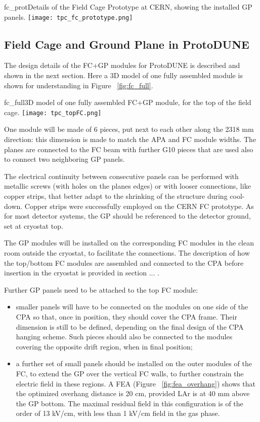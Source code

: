 \begin{cdrfigure}{fc_prot}{Details of the Field Cage Prototype at CERN, showing the installed GP panels.}
\texttt{[image: tpc\_fc\_prototype.png]}
\end{cdrfigure}

\subsection{Field Cage and Ground Plane in ProtoDUNE}

The design details of the FC+GP modules for ProtoDUNE is described and shown in the next section. Here a 3D model of one fully assembled module is shown for understanding in Figure ~\ref{fig:fc_full}.

\begin{cdrfigure}{fc_full}{3D model of one fully assembled FC+GP module, for the top of the field cage. }
\texttt{[image: tpc\_topFC.png]}
\end{cdrfigure}

One module will be made of 6 pieces, put next to each other along the 2318 mm direction: this dimension is made to match the APA and FC module widths. The planes are connected to the FC beam with further G10 pieces that are used also to connect two neighboring GP panels.

The electrical continuity between consecutive panels can be performed with metallic screws (with holes on the planes edges) or with looser connections, like copper strips, that better adapt to the shrinking of the structure during cool-down. Copper strips were successfully employed on the CERN FC prototype.
As for most detector systems, the GP should be referenced to the detector ground, set at cryostat top.

The GP modules will be installed on the corresponding FC modules in the clean room outside the cryostat, to facilitate the connections. The description of how the top/bottom FC modules are assembled and connected to the CPA before insertion in the cryostat is provided in section ... .

Further GP panels need to be attached to the top FC module:
\begin{itemize}
\item smaller panels will have to be connected on the modules on one side of the CPA so that, once in position, they should cover the CPA frame. Their dimension is still to be defined, depending on the final design of the CPA hanging scheme. Such pieces should also be connected to the modules covering the opposite drift region, when in final position;
\item a further set of small panels should be installed on the outer modules of the FC, to extend the GP over the vertical FC walls, to further constrain the electric field in these regions. A FEA (Figure ~\ref{fig:fea_overhang}) shows that the optimized overhang distance is 20 cm, provided LAr is at 40 mm above the GP bottom. The maximal residual field in this configuration is of the order of 13 kV/cm, with less than 1 kV/cm field in the gas phase.
\end{itemize}

